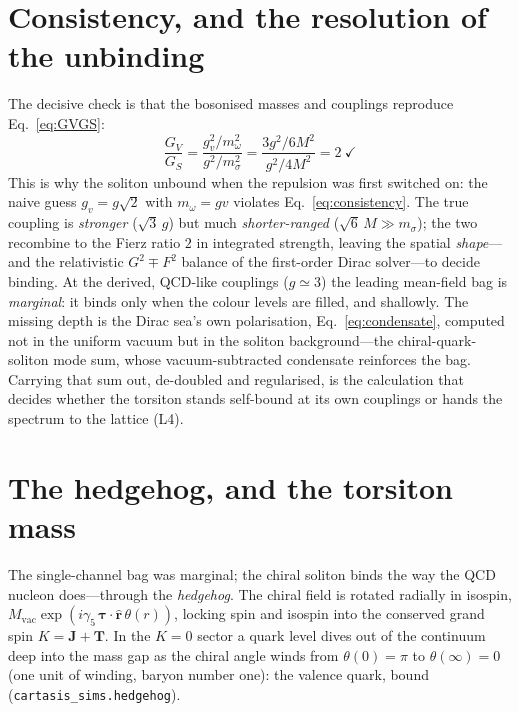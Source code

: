 \section{Consistency, and the resolution of the unbinding}
The decisive check is that the bosonised masses and couplings reproduce
Eq.~\eqref{eq:GVGS}:
\begin{equation}
  \frac{G_V}{G_S}=\frac{g_v^2/m_\omega^2}{g^2/m_\sigma^2}
  =\frac{3g^2/6M^2}{g^2/4M^2}=2\ \checkmark
  \label{eq:consistency}
\end{equation}
This is why the soliton unbound when the repulsion was first switched on: the naive guess
$g_v=g\sqrt2$ with $m_\omega=gv$ violates Eq.~\eqref{eq:consistency}. The true coupling is
\emph{stronger} ($\sqrt3\,g$) but much \emph{shorter-ranged} ($\sqrt6\,M\gg m_\sigma$); the two
recombine to the Fierz ratio $2$ in integrated strength, leaving the spatial \emph{shape}---and the
relativistic $G^2\!\mp\!F^2$ balance of the first-order Dirac solver---to decide binding. At the
derived, QCD-like couplings ($g\simeq3$) the leading mean-field bag is \emph{marginal}: it binds
only when the colour levels are filled, and shallowly. The missing depth is the Dirac sea's own
polarisation, Eq.~\eqref{eq:condensate}, computed not in the uniform vacuum but in the soliton
background---the chiral-quark-soliton mode sum, whose vacuum-subtracted condensate reinforces the
bag. Carrying that sum out, de-doubled and regularised, is the calculation that decides whether the
torsiton stands self-bound at its own couplings or hands the spectrum to the lattice (L4).

\section{The hedgehog, and the torsiton mass}
\label{sec:hedgehog-mass}
The single-channel bag was marginal; the chiral soliton binds the way the QCD nucleon does---through
the \emph{hedgehog}. The chiral field is rotated radially in isospin, $M_\mathrm{vac}\exp(i\gamma_5\,
\boldsymbol\tau\!\cdot\!\hat{\mathbf r}\,\theta(r))$, locking spin and isospin into the conserved
grand spin $K=\mathbf J+\mathbf T$. In the $K{=}0$ sector a quark level dives out of the continuum
deep into the mass gap as the chiral angle winds from $\theta(0)=\pi$ to $\theta(\infty)=0$ (one unit
of winding, baryon number one): the valence quark, bound (\texttt{cartasis\_sims.hedgehog}).

